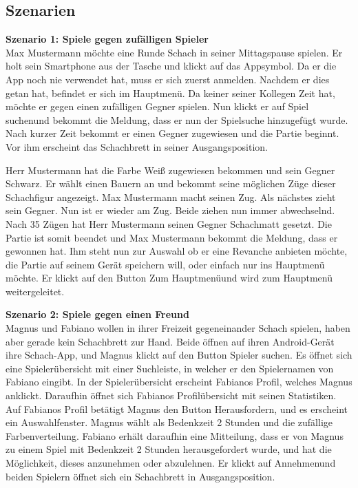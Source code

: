\documentclass[parskip=full]{scrartcl}
\begin{document}
\subsection{Szenarien}
\textbf{Szenario 1: \glqq Spiele gegen zufälligen Spieler\grqq} \\
Max Mustermann möchte eine Runde \Gls{Schach} in seiner Mittagspause spielen. Er holt sein \gls{Smartphone} aus der Tasche und klickt auf das Appsymbol.
Da er die App noch nie verwendet hat, muss er sich zuerst anmelden. Nachdem er dies getan hat, befindet er sich im Hauptmenü.
Da keiner seiner Kollegen Zeit hat, möchte er gegen einen zufälligen Gegner spielen. Nun klickt er auf \glqq Spiel suchen\grqq und bekommt die Meldung, dass er nun der Spielsuche hinzugefügt wurde.
Nach kurzer Zeit bekommt er einen Gegner zugewiesen und die Partie beginnt. Vor ihm erscheint das \gls{Schachbrett} in seiner \gls{Ausgangsposition}.

Herr Mustermann hat die Farbe Weiß zugewiesen bekommen und sein Gegner Schwarz. Er wählt einen Bauern an und bekommt seine möglichen Züge dieser \gls{Schachfigur} angezeigt.
Max Mustermann macht seinen Zug. Als nächstes zieht sein Gegner. Nun ist er wieder am Zug. Beide ziehen nun immer abwechselnd. Nach 35 Zügen hat Herr Mustermann
seinen Gegner \gls{Schachmatt} gesetzt. Die Partie ist somit beendet und Max Mustermann bekommt die Meldung, dass er gewonnen hat. Ihm steht nun zur Auswahl ob er eine Revanche anbieten möchte, die Partie auf seinem Gerät speichern will, oder einfach nur ins Hauptmenü möchte. Er klickt auf den Button \glqq Zum Hauptmenü\grqq und wird zum Hauptmenü weitergeleitet.

\textbf{Szenario 2: \glqq Spiele gegen einen Freund\grqq} \\
Magnus und Fabiano wollen in ihrer Freizeit gegeneinander Schach spielen, haben aber gerade kein Schachbrett zur Hand. Beide öffnen auf ihren \gls{Android}-Gerät ihre Schach-App, und Magnus klickt auf den Button \glqq Spieler suchen\grqq. Es öffnet sich eine Spielerübersicht mit einer Suchleiste, in welcher er den Spielernamen von Fabiano eingibt. In der Spielerübersicht erscheint Fabianos Profil, welches Magnus anklickt. Daraufhin öffnet sich Fabianos Profilübersicht mit seinen Statistiken. Auf Fabianos Profil betätigt Magnus den Button \glqq Herausfordern\grqq, und es erscheint ein Auswahlfenster. Magnus wählt als \gls{Bedenkzeit} 2 Stunden und die zufällige Farbenverteilung. Fabiano erhält daraufhin eine Mitteilung, dass er von Magnus zu einem Spiel mit \gls{Bedenkzeit} 2 Stunden herausgefordert wurde, und hat die Möglichkeit, dieses anzunehmen oder abzulehnen. Er klickt auf \glqq Annehmen\grqq und beiden Spielern öffnet sich ein \gls{Schachbrett} in \gls{Ausgangsposition}.
\end{document}
